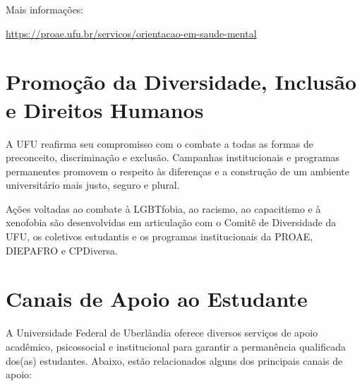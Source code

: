 Mais informações:

{\footnotesize\url{https://proae.ufu.br/servicos/orientacao-em-saude-mental}}

\section{Promoção da Diversidade, Inclusão e Direitos Humanos}

A UFU reafirma seu compromisso com o combate a todas as formas de preconceito, discriminação e exclusão. Campanhas institucionais e programas permanentes promovem o respeito às diferenças e a construção de um ambiente universitário mais justo, seguro e plural.

Ações voltadas ao combate à LGBTfobia, ao racismo, ao capacitismo e à xenofobia são desenvolvidas em articulação com o Comitê de Diversidade da UFU, os coletivos estudantis e os programas institucionais da PROAE, DIEPAFRO e CPDiversa.

\section{Canais de Apoio ao Estudante}

A Universidade Federal de Uberlândia oferece diversos serviços de apoio acadêmico, psicossocial e institucional para garantir a permanência qualificada dos(as) estudantes. Abaixo, estão relacionados alguns dos principais canais de apoio:

